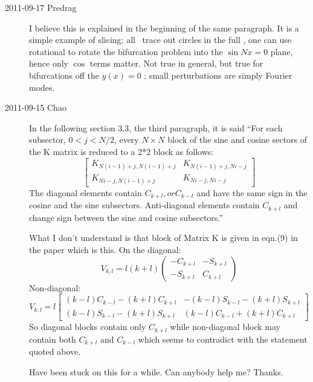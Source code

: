 \begin{description}
\item[2011-09-17 Predrag] I believe this is explained in the beginning of
the same paragraph. It is a simple example of slicing; all \reqva\ trace
out circles in the full \statesp, one can use rotational  to
rotate the bifurcation problem into the $\sin Nx = 0$ plane, hence only $\cos$
terms matter. Not true in general, but true for bifurcations off the $y(x)=0$
\eqv; small perturbations are simply Fourier modes.


\item[2011-09-15 Chao]
In the following section 3.3, the third paragraph, it is said ``For each
subsector, $0<j<N/2$, every $N \times N$ block of the sine and cosine sectors of the
K matrix is reduced to a 2*2 block as follows:
\[
\left[
\begin{array}{cc}
K_{N(i-1)+j,N(i-1)+j}   &  K_{N(i-1)+j,Ni-j}\\
K_{Ni-j,N(i-1)+j}   &   K_{Ni-j,Ni-j}
\end{array}
\right]
\]
The diagonal elements contain $C_{k+l}, or C_{k-l}$ and have the same
sign in the cosine and the sine subsectors. Anti-diagonal elements
contain $C_{k+l}$ and change sign between the sine and cosine
subsectors.''

What I don't understand is that block of Matrix K is given in eqn.(9) in
the paper which is this. On the diagonal:
\[
V_{k,l}
=
l(k+l)
\left(
\begin{array}{cc}
-C_{k+l}   &  -S_{k+l}\\
-S_{k+l}   &   C_{k+l}
\end{array}
\right)
\]
Non-diagonal:
\[
V_{k,l}
=
l
\left[
\begin{array}{cc}
(k-l)C_{k-l}-(k+l)C_{k+l}   &  -(k-l)S_{k-l}-(k+l)S_{k+l}\\
(k-l)S_{k-l}-(k+l)S_{k+l}   &   (k-l)C_{k-l}+(k+l)C_{k+l}
\end{array}
\right]
\]
So diagonal blocks contain only $C_{k+l}$ while non-diagonal block may
contain both $C_{k+l}$ and $C_{k-l}$ which seems to contradict with the
statement quoted above.

Have been stuck on this for a while. Can anybody help me? Thanks.



\end{description}
